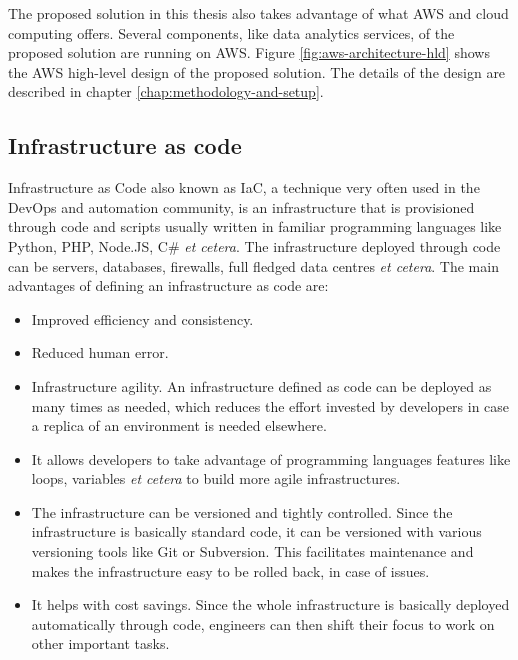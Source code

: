 The proposed solution in this thesis also takes advantage of what AWS and cloud computing offers. Several components, like data analytics services, of the proposed solution are running on AWS. Figure \ref{fig:aws-architecture-hld} shows the AWS high-level design of the proposed solution. The details of the design are described in chapter \ref{chap:methodology-and-setup}.




\subsection{Infrastructure as code}
\label{subsec:iac}

Infrastructure as Code also known as IaC, a technique very often used in the DevOps and automation community, is an infrastructure that is provisioned through code and scripts usually written in familiar programming languages like Python, PHP, Node.JS, C\# \textit{et cetera}. The infrastructure deployed through code can be servers, databases, firewalls, full fledged data centres \textit{et cetera}. The main advantages of defining an infrastructure as code are:

\begin{itemize}
    \item Improved efficiency and consistency.
    \item Reduced human error.
    \item Infrastructure agility. An infrastructure defined as code can be deployed as many times as needed, which reduces the effort invested by developers in case a replica of an environment is needed elsewhere.
    \item It allows developers to take advantage of programming languages features like loops, variables \textit{et cetera} to build more agile infrastructures.
    \item The infrastructure can be versioned and tightly controlled. Since the infrastructure is basically standard code, it can be versioned with various versioning tools like Git or Subversion. This facilitates maintenance and makes the infrastructure easy to be rolled back, in case of issues.
    \item It helps with cost savings. Since the whole infrastructure is basically deployed automatically through code, engineers can then shift their focus to work on other important tasks.
\end{itemize}

